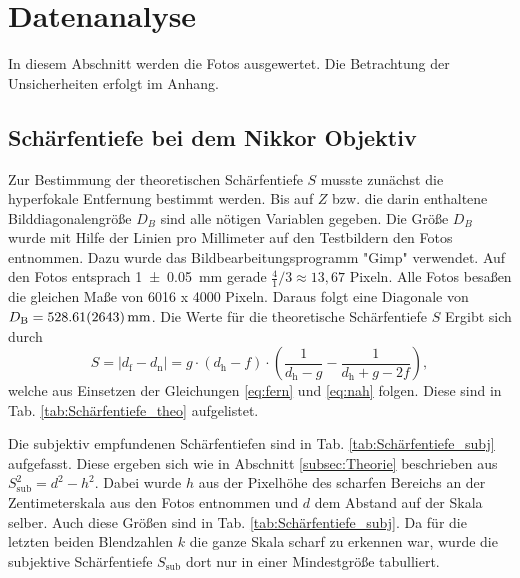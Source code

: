 \section{Datenanalyse} \label{sec:Analyse}
	
	In diesem Abschnitt werden die Fotos ausgewertet.
	Die Betrachtung der Unsicherheiten erfolgt im Anhang.
	
	\subsection{Schärfentiefe bei dem Nikkor Objektiv}
		
		Zur Bestimmung der theoretischen Schärfentiefe $S$ musste zunächst die hyperfokale Entfernung bestimmt werden.
		Bis auf $Z$ bzw. die darin enthaltene Bilddiagonalengröße $D_B$ sind alle nötigen Variablen gegeben.
		Die Größe $D_B$ wurde mit Hilfe der Linien pro Millimeter auf den Testbildern den Fotos entnommen.
		Dazu wurde das Bildbearbeitungsprogramm "Gimp"\cite{Gimp} verwendet.
		Auf den Fotos entsprach \SI{1+-0,05}{\milli\meter} gerade $\frac 41/3 \approx 13,67$ Pixeln.
		Alle Fotos besaßen die gleichen Maße von 6016 x 4000 Pixeln.
		Daraus folgt eine Diagonale von $D_\text{B} = \SI{528,61+-26,43}{\milli\meter}$.
		Die Werte für die theoretische Schärfentiefe $S$ Ergibt sich durch
		\begin{equation}
			S = |d_\text{f}-d_\text{n}| = g\cdot (d_\text{h}-f) \cdot \left( \frac{1}{d_\text{h} - g} - \frac{1}{d_\text{h} + g -2f} \right),
		\end{equation}
		welche aus Einsetzen der Gleichungen \ref{eq:fern} und \ref{eq:nah} folgen.
		Diese sind in Tab. \ref{tab:Schärfentiefe_theo} aufgelistet.
		
		Die subjektiv empfundenen Schärfentiefen sind in Tab. \ref{tab:Schärfentiefe_subj} aufgefasst.
		Diese ergeben sich wie in Abschnitt \ref{subsec:Theorie} beschrieben aus $S_\text{sub}^2 = d^2 - h^2$.
		Dabei wurde $h$ aus der Pixelhöhe des scharfen Bereichs an der Zentimeterskala aus den Fotos entnommen und $d$ dem Abstand auf der Skala selber.
		Auch diese Größen sind in Tab. \ref{tab:Schärfentiefe_subj}.
		Da für die letzten beiden Blendzahlen $k$ die ganze Skala scharf zu erkennen war, wurde die subjektive Schärfentiefe $S_\text{sub}$ dort nur in einer Mindestgröße tabulliert.
			
